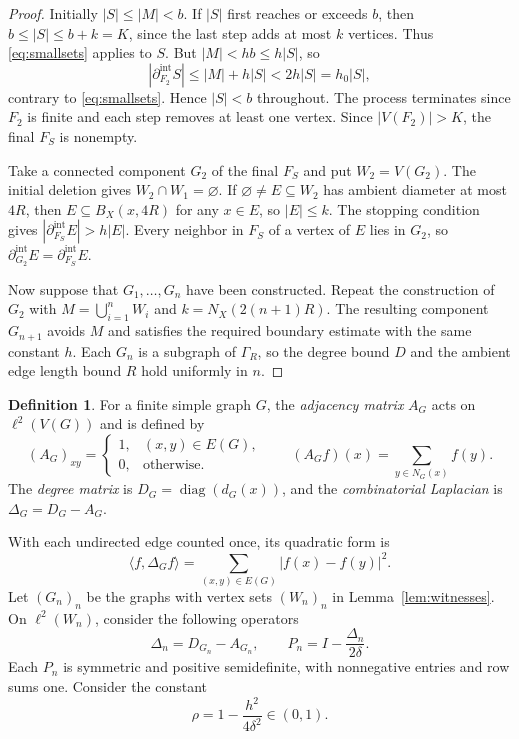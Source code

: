 \documentclass[11pt,a4paper]{article}
\theoremstyle{definition}\newtheorem{definition}[theorem]{Definition}
\theoremstyle{remark}\newtheorem{remark}[theorem]{Remark}
\begin{document}
\begin{proof}
Initially $|S|\le |M|<b$. If $|S|$ first reaches or exceeds $b$,
then $b\le |S|\le b+k=K$, since the last step adds at most $k$
vertices. Thus \eqref{eq:smallsets} applies to $S$. But
$|M|<hb\le h|S|$, so
$$
|\partial_{F_2}^{\mathrm{int}}S|
\le |M|+h|S|<2h|S|=h_0|S|,
$$
contrary to \eqref{eq:smallsets}. Hence $|S|<b$ throughout.
The process terminates since $F_2$ is finite and each step
removes at least one vertex. Since $|V(F_2)|>K$, the final
$F_S$ is nonempty.

Take a connected component $G_2$ of the final $F_S$ and put
$W_2=V(G_2)$. The initial deletion gives
$W_2\cap W_1=\varnothing$. If $\varnothing\ne E\subseteq W_2$
has ambient diameter at most $4R$, then $E\subseteq B_X(x,4R)$
for any $x\in E$, so $|E|\le k$. The stopping condition gives
$|\partial_{F_S}^{\mathrm{int}}E|>h|E|$. Every neighbor in $F_S$
of a vertex of $E$ lies in $G_2$, so
$\partial_{G_2}^{\mathrm{int}}E=\partial_{F_S}^{\mathrm{int}}E$.

Now suppose that $G_1,\ldots,G_n$ have been constructed. Repeat
the construction of $G_2$ with $M=\bigcup_{i=1}^{n}W_i$ and
$k=N_X(2(n+1)R)$. The resulting component $G_{n+1}$ avoids $M$
and satisfies the required boundary estimate with the same
constant $h$. Each $G_n$ is a subgraph of $\Gamma_R$, so the
degree bound $D$ and the ambient edge length bound $R$ hold
uniformly in $n$.
\end{proof}


\begin{definition}\label{def:graphoperators}
For a finite simple graph $G$, the \emph{adjacency matrix} $A_G$
acts on $\ell^2(V(G))$ and is defined by
$$
(A_G)_{xy}=\begin{cases}1,&(x,y)\in E(G),\\0,&\text{otherwise}.
\end{cases}
\qquad (A_G f)(x)=\sum_{y\in N_G(x)}f(y).
$$
The \emph{degree matrix} is
$D_G=\operatorname{diag}(d_G(x))$, and the \emph{combinatorial
Laplacian} is $\Delta_G=D_G-A_G$. 
\end{definition}
With each undirected edge
counted once, its quadratic form is
$$
\langle f,\Delta_G f\rangle
=\sum_{(x,y)\in E(G)}|f(x)-f(y)|^2.
$$
Let $(G_n)_n$ be the graphs with vertex sets $(W_n)_n$ in Lemma~\ref{lem:witnesses}. On $\ell^2(W_n)$,  consider the following operators
$$
\Delta_n=D_{G_n}-A_{G_n},\qquad
P_n=I-\frac{\Delta_n}{2\delta}.
$$
Each $P_n$ is symmetric and positive semidefinite, with nonnegative
entries and row sums one.
Consider the constant
$$\rho=1-\frac{h^2}{4\delta^2}\in(0,1).$$
\end{document}
